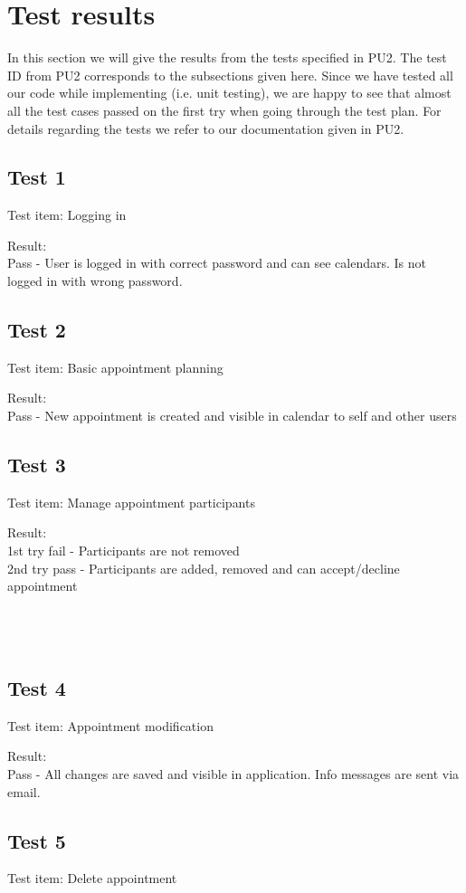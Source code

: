 \section{Test results}
In this section we will give the results from the tests specified in PU2. The test ID from PU2 corresponds to the subsections given here. Since we have tested all our code while implementing (i.e. unit testing), we are happy to see that almost all the test cases passed on the first try when going through the test plan. For details regarding the tests we refer to our documentation given in PU2.
\subsection{Test 1}
Test item: Logging in

Result: \\Pass - User is logged in with correct password and can see calendars. Is not logged in with wrong password.

\subsection{Test 2}
Test item: Basic appointment planning

Result: \\Pass - New appointment is created and visible in calendar to self and other users

\subsection{Test 3}
Test item: Manage appointment participants

Result: \\1st try fail - Participants are not removed\\
2nd try pass - Participants are added, removed and can accept/decline appointment\\
\\
\\
\\

\subsection{Test 4}
Test item: Appointment modification

Result: \\Pass - All changes are saved and visible in application. Info messages are sent via email.

\subsection{Test 5}
Test item: Delete appointment

